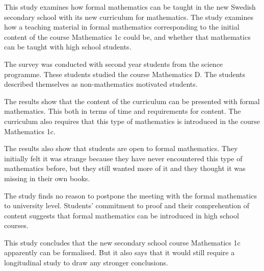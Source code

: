 \noindent
This study examines how formal mathematics can be taught in the new Swedish 
secondary school with its new curriculum for mathematics. 
The study examines how a teaching material in formal mathematics 
corresponding to the initial content of the course Mathematics 1c could be, and 
whether that mathematics can be taught with high school students. 

The survey was conducted with second year students from the science programme.
These students studied the course Mathematics D. 
The students described themselves as non-mathematics motivated students. 

The results show that the content of the curriculum can be presented with
formal mathematics. 
This both in terms of time and requirements for content.
The curriculum also requires that this type of mathematics is introduced in
the course Mathematics 1c.

The results also show that students are open to formal mathematics. 
They initially felt it was strange because they have never encountered this 
type of mathematics before, but they still wanted more of it and they thought
it was missing in their own books.

The study finds no reason to postpone the meeting with the formal mathematics 
to university level. 
Students' commitment to proof and their comprehention of content suggests that
formal mathematics can be introduced in high school courses. 

This study concludes that the new secondary school course Mathematics 1c
apparently can be formalised.
But it also says that it would still require a longitudinal study to draw any
stronger conclusions.
